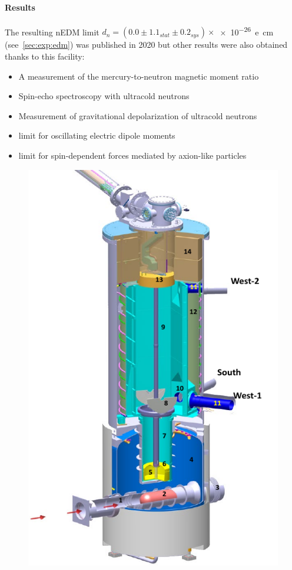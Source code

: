 \begin{refsection}
            \paragraph{Results}
            The resulting nEDM limit $d_n = (0.0 \pm 1.1_{stat}\pm0.2_{sys})\times$\SI{e-26}{e cm} (see~\ref{sec:exp:edm}) was published in 2020 \cite{nEDM}  but other results were also obtained thanks to this facility:
            \begin{itemize}
                \item A measurement of the mercury-to-neutron magnetic moment ratio
                \item Spin-echo spectroscopy with ultracold neutrons
                \item Measurement of gravitational depolarization of ultracold neutrons
                \item limit for oscillating electric dipole moments
                \item limit for spin-dependent forces mediated by axion-like particles
            \end{itemize}
            \begin{figure}
                \centering
                \includegraphics[scale = 0.5]{Figures/Introduction/UCN_CAD.png}

\end{figure}
\end{refsection}
